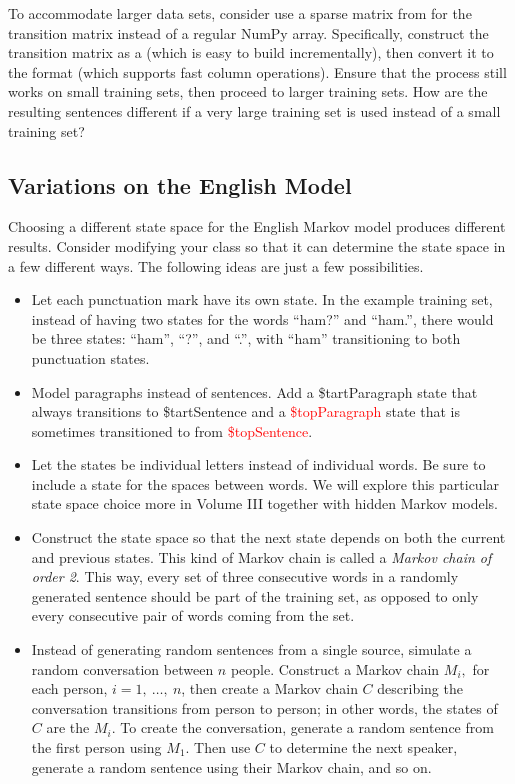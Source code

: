 To accommodate larger data sets, consider use a sparse matrix from  for the transition matrix instead of a regular NumPy array.
Specifically, construct the transition matrix as a  (which is easy to build incrementally), then convert it to the  format (which supports fast column operations).
Ensure that the process still works on small training sets, then proceed to larger training sets.
How are the resulting sentences different if a very large training set is used instead of a small training set?

\subsection*{Variations on the English Model} %

Choosing a different state space for the English Markov model produces different results.
Consider modifying your  class so that it can determine the state space in a few different ways.
The following ideas are just a few possibilities.

\begin{itemize}
\item Let each punctuation mark have its own state.
In the example training set, instead of having two states for the words ``ham?'' and ``ham.'', there would be three states: ``ham'', ``?'', and ``.'', with ``ham'' transitioning to both punctuation states.

\item Model paragraphs instead of sentences.
Add a \textcolor[rgb]{0,.6,0}{\$tartParagraph} state that always transitions to \textcolor[rgb]{0,.6,0}{\$tartSentence} and a \textcolor{red}{\$topParagraph} state that is sometimes transitioned to from \textcolor{red}{\$topSentence}.

\item Let the states be individual letters instead of individual words.
Be sure to include a state for the spaces between words.
We will explore this particular state space choice more in Volume III together with hidden Markov models.

\item Construct the state space so that the next state depends on both the current and previous states.
This kind of Markov chain is called a \emph{Markov chain of order 2}.
This way, every set of three consecutive words in a randomly generated sentence should be part of the training set, as opposed to only every consecutive pair of words coming from the set.

\item Instead of generating random sentences from a single source, simulate a random conversation between $n$ people.
Construct a Markov chain $M_i,$ for each person, $i=1,\ \ldots,\ n$, then create a Markov chain $C$ describing the conversation transitions from person to person; in other words, the states of $C$ are the $M_i$.
To create the conversation, generate a random sentence from the first person using $M_1$.
Then use $C$ to determine the next speaker, generate a random sentence using their Markov chain, and so on.
\end{itemize}

